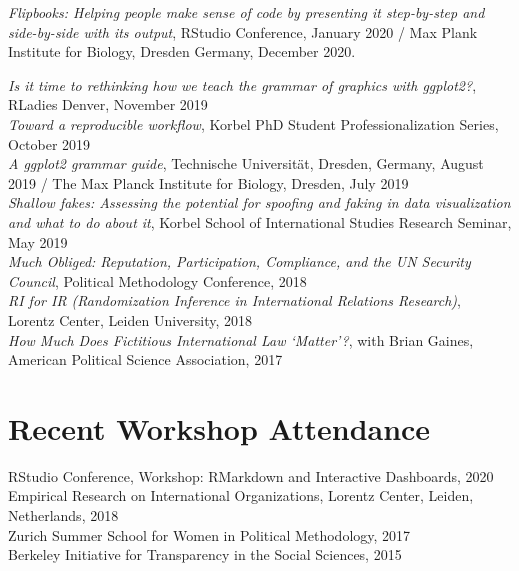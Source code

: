 \documentclass[margin, 10pt]{CVStyleTemplate}\usepackage[]{graphicx}\usepackage[dvipsnames]{xcolor}
\begin{document}
\begin{resume}
\emph{Flipbooks: Helping people make sense of code by presenting it step-by-step and side-by-side with its output},
RStudio Conference, January 2020 /
Max Plank Institute for Biology, Dresden Germany, December 2020.

%
\emph{Is it time to rethinking how we teach the grammar of graphics with ggplot2?}, RLadies Denver, November 2019\\[6pt]
%
\emph{Toward a reproducible workflow},  Korbel PhD Student Professionalization Series, October 2019 \\[6pt]
%
\emph{A ggplot2 grammar guide}, Technische Universit\"{a}t, Dresden, Germany, August 2019 / The Max Planck Institute for Biology, Dresden, July 2019 \\[6pt]
%
\emph{Shallow fakes: Assessing the potential for spoofing and faking in data visualization and what to do about it}, Korbel School of International Studies Research Seminar, May 2019 \\[6pt]
%
\emph{Much Obliged: Reputation, Participation, Compliance, and the UN Security Council}, Political Methodology Conference, 2018 \\[6pt]
%
\emph{RI for IR (Randomization Inference in International Relations Research)}, Lorentz Center, Leiden University, 2018\\[6pt] %
%
\emph{How Much Does Fictitious International Law `Matter'?}, with Brian Gaines, American Political Science Association, 2017 \\[6pt]%


\section{Recent Workshop Attendance}

RStudio Conference, Workshop: RMarkdown and Interactive Dashboards, 2020 \\[6pt]
Empirical Research on International Organizations, Lorentz Center, Leiden, Netherlands, 2018 \\[6pt]
Zurich Summer School for Women in Political Methodology, 2017\\[6pt]
Berkeley Initiative for Transparency in the Social Sciences, 2015\\[6pt]%


\end{resume}
\end{document}

